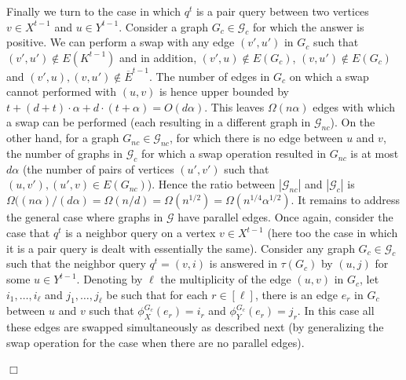 \documentclass{article}
\newcommand{\calG}{{\mathcal{G}}}
\newenvironment{proof}{\smallskip\noindent{\bf Proof:}}%
        {\hspace*{\fill}$\Box$\par}
\begin{document}
\begin{proof}
 Finally we turn to the case in which $q^t$ is a pair query between two vertices $v\in X^{t-1}$ and $u\in Y^{t-1}$. Consider a graph $G_c \in \calG_c$ for which the answer is positive.
 We can perform a swap with any edge $(v',u')$ in $G_c$ such that
 $(v',u')\notin E(K^{t-1})$ and  in addition, $(v',u)\notin E(G_c)$, $(v,u')\notin E(G_c)$ and $(v',u), (v,u')\notin \overline{E}^{t-1}$. The number of edges in $G_c$ on which a swap cannot performed with $(u,v)$ is hence upper bounded by $t+ (d+t)\cdot \alpha + d\cdot (t+\alpha) = O(d\alpha)$. This leaves $\Omega(n\alpha)$ edges with which a swap can be performed (each resulting in a different graph in $\calG_{nc}$). On the other hand, for a graph $G_{nc}\in \calG_{nc}$, for which there is no edge between $u$ and $v$, the number of graphs in $\calG_c$ for which a swap operation resulted in $G_{nc}$ is at most $d\alpha$ (the number of pairs of vertices $(u',v')$ such that $(u,v'),(u',v)\in E(G_{nc})$). Hence the ratio between $|\calG_{nc}|$ and $|\calG_c|$ is $\Omega((n\alpha)/(d\alpha) = \Omega(n/d) = \Omega(n^{1/2})= \Omega(n^{1/4}\alpha^{1/2})$.
\iffalse
It remains to address the general  case where graphs in $\calG$ have parallel edges. Once again, consider the case that $q^t$ is a neighbor query on a vertex $v\in X^{t-1}$ (here too the case in which it is a pair query is dealt with essentially the same). Consider any graph $G_c \in \calG_c$ such that  the neighbor query $q^t = (v,i)$  is answered in $\tau(G_c)$ by $(u,j)$ for some $u \in Y^{t-1}$. Denoting by $\ell$ the multiplicity of the edge $(u,v)$ in $G_c$, let $i_1,\dots,i_\ell$ and $j_1,\dots,j_\ell$ be such that for each $r \in [\ell]$, there is an edge $e_r$ in $G_c$ between $u$ and $v$ such that $\phi^{G_c}_X(e_r)=i_r$ and $\phi^{G_c}_Y(e_r)=j_r$.
      In this case all these edges are swapped simultaneously as described next (by generalizing the swap operation for the case when there are no parallel edges).


\end{proof}
\end{document}

